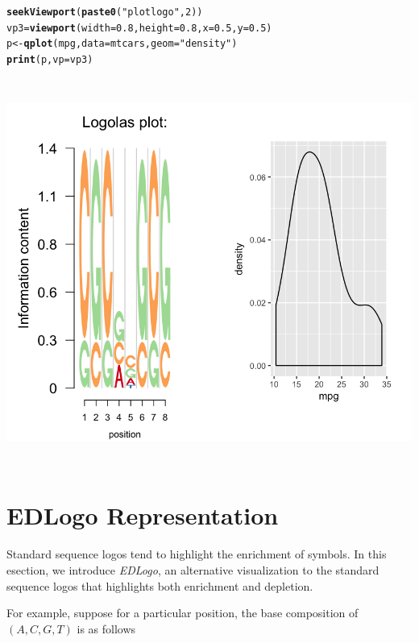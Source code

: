 \documentclass[12pt]{article}\usepackage[]{graphicx}\usepackage[usenames,dvipsnames]{color}
\makeatletter
\newcommand{\hlnum}[1]{\textcolor[rgb]{0.686,0.059,0.569}{#1}}%
\newcommand{\hlstr}[1]{\textcolor[rgb]{0.192,0.494,0.8}{#1}}%
\newcommand{\hlstd}[1]{\textcolor[rgb]{0.345,0.345,0.345}{#1}}%
\newcommand{\hlkwb}[1]{\textcolor[rgb]{0.69,0.353,0.396}{#1}}%
\newcommand{\hlkwc}[1]{\textcolor[rgb]{0.333,0.667,0.333}{#1}}%
\newcommand{\hlkwd}[1]{\textcolor[rgb]{0.737,0.353,0.396}{\textbf{#1}}}%
\newenvironment{kframe}{%
 \def\at@end@of@kframe{}%
 \ifinner\ifhmode%
  \def\at@end@of@kframe{\end{minipage}}%
  \begin{minipage}{\columnwidth}%
 \fi\fi%
 \def\FrameCommand##1{\hskip\@totalleftmargin \hskip-\fboxsep
 \colorbox{shadecolor}{##1}\hskip-\fboxsep
     \hskip-\linewidth \hskip-\@totalleftmargin \hskip\columnwidth}%
 \MakeFramed {\advance\hsize-\width
   \@totalleftmargin\z@ \linewidth\hsize
   \@setminipage}}%
 {\par\unskip\endMakeFramed%
 \at@end@of@kframe}
\newenvironment{knitrout}{}{} %
\makeatother
\begin{document}
\begin{knitrout}
\begin{kframe}
\begin{alltt}
\hlkwd{seekViewport}\hlstd{(}\hlkwd{paste0}\hlstd{(}\hlstr{"plotlogo"}\hlstd{,} \hlnum{2}\hlstd{))}
\hlstd{vp3} \hlkwb{=} \hlkwd{viewport}\hlstd{(}\hlkwc{width}\hlstd{=}\hlnum{0.8}\hlstd{,} \hlkwc{height}\hlstd{=}\hlnum{0.8}\hlstd{,} \hlkwc{x} \hlstd{=} \hlnum{0.5}\hlstd{,} \hlkwc{y} \hlstd{=} \hlnum{0.5}\hlstd{)}
\hlstd{p} \hlkwb{<-} \hlkwd{qplot}\hlstd{(mpg,} \hlkwc{data}\hlstd{=mtcars,} \hlkwc{geom}\hlstd{=}\hlstr{"density"}\hlstd{)}
\hlkwd{print}\hlstd{(p,} \hlkwc{vp} \hlstd{= vp3)}
\end{alltt}
\end{kframe}
\includegraphics[width=6in,height=5in]{figure/ggplot2-1} 

\end{knitrout}

\section{EDLogo Representation}

Standard sequence logos tend to highlight the enrichment of symbols. In this esection, we introduce \textit{EDLogo}, an alternative visualization to the standard sequence logos that highlights both enrichment and depletion.

For example, suppose for a particular position, the base composition of $ \left (A, C, G, T \right)$ is as follows
\end{document}
